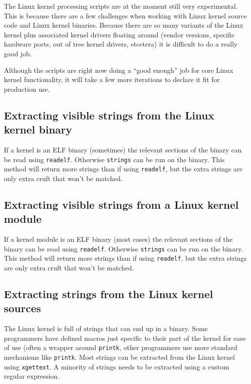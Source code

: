 \documentclass[10pt]{article}
\begin{document}
The Linux kernel processing scripts are at the moment still very experimental.
This is because there are a few challenges when working with Linux kernel
source code and Linux kernel binaries. Because there are so many variants of
the Linux kernel plus associated kernel drivers floating around (vendor
versions, specific hardware ports, out of tree kernel drivers, etcetera) it is
difficult to do a really good job.

Although the scripts are right now doing a ``good enough'' job for core Linux
kernel functionality, it will take a few more iterations to declare it fit for
production use.

\subsection{Extracting visible strings from the Linux kernel binary}

If a kernel is an ELF binary (sometimes) the relevant sections of the
binary can be read using \texttt{readelf}. Otherwise \texttt{strings} can be
run on the binary. This method will return more strings than if using
\texttt{readelf}, but the extra strings are only extra cruft that won't be
matched.

\subsection{Extracting visible strings from a Linux kernel module}

If a kernel module is an ELF binary (most cases) the relevant sections of the
binary can be read using \texttt{readelf}. Otherwise \texttt{strings} can be
run on the binary. This method will return more strings than if using
\texttt{readelf}, but the extra strings are only extra cruft that won't be
matched.

\subsection{Extracting strings from the Linux kernel sources}

The Linux kernel is full of strings that can end up in a binary. Some
programmers have defined macros just specific to their part of the kernel for
ease of use (often a wrapper around \texttt{printk}, other programmers use
more standard mechanisms like \texttt{printk}. Most strings can be extracted
from the Linux kernel using \texttt{xgettext}. A minority of strings needs to
be extracted using a custom regular expression.
\end{document}
